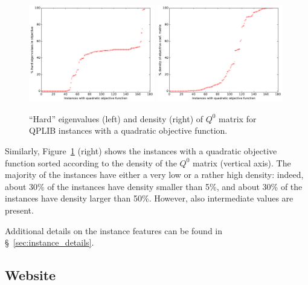 \begin{figure}\centering
  \includegraphics[width=0.49\textwidth]{pic_neg_eig.pdf}
  \includegraphics[width=0.49\textwidth]{pic_density.pdf}
  \caption{``Hard'' eigenvalues (left) and density (right) of $Q^0$ matrix for QPLIB instances with a quadratic objective function. \label{fig:pic_neg_eig}}
\end{figure}

Similarly, Figure~\ref{fig:pic_neg_eig} (right) shows the instances with a
quadratic objective function sorted according to the density of the
$Q^0$ matrix (vertical axis). The majority of the instances have either
a very low or a rather high density: indeed, about 30\% of the instances
have density smaller than 5\%, and about 30\% of the instances have
density larger than 50\%. However, also intermediate values are present. 


Additional details on the instance features can be found in \S~\ref{sec:instance_details}.


\subsection{Website}

